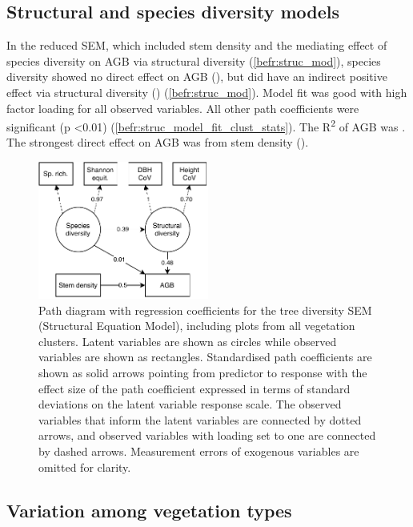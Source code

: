 \begin{refsection}
\subsection{Structural and species diversity models}
\label{befr:ssec:struc}

In the reduced SEM, which included stem density and the mediating effect of species diversity on AGB via structural diversity (\autoref{befr:struc_mod}), species diversity showed no direct effect on AGB (\strucbetadb{}), but did have an indirect positive effect via structural diversity (\strucbetadib{}) (\autoref{befr:struc_mod}). Model fit was good with high factor loading for all observed variables. All other path coefficients were significant (p <0.01) (\autoref{befr:struc_model_fit_clust_stats}). The R\textsuperscript{2} of AGB was \strucrsq{}. The strongest direct effect on AGB was from stem density (\strucbetaib{}).



\begin{figure}[tb]
\centering
	\includegraphics[width=0.5\textwidth]{img/struc.drawio}
	\caption[Path diagram for vegetation type model]{Path diagram with regression coefficients for the tree diversity SEM (Structural Equation Model), including plots from all vegetation clusters. Latent variables are shown as circles while observed variables are shown as rectangles. Standardised path coefficients are shown as solid arrows pointing from predictor to response with the effect size of the path coefficient expressed in terms of standard deviations on the latent variable response scale. The observed variables that inform the latent variables are connected by dotted arrows, and observed variables with loading set to one are connected by dashed arrows. Measurement errors of exogenous variables are omitted for clarity.}
	\label{befr:struc_mod}
\end{figure}

\subsection{Variation among vegetation types}
\label{befr:ssec:veg}


\end{refsection}
